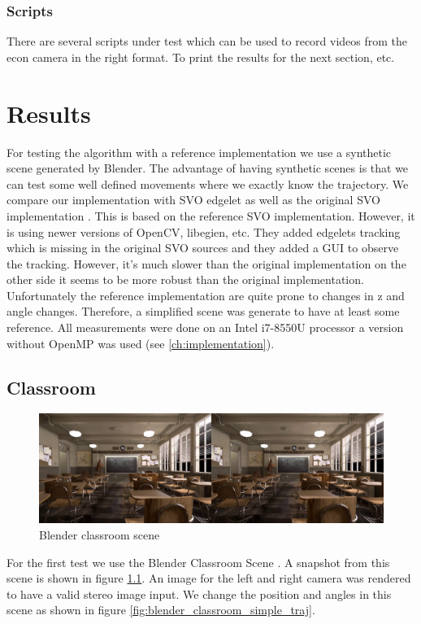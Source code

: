 \documentclass[11pt,a4paper,titlepage,oneside]{report}
\begin{document}
\subsection{Scripts}
There are several scripts under test which can be used to record videos from the econ camera in the right format. To print the results for the next section, etc.

\chapter{Results}\label{ch:results}

For testing the algorithm with a reference implementation we use a synthetic scene generated by Blender. The advantage of having synthetic scenes is that we can test some well defined movements where we exactly know the trajectory. We compare our implementation with SVO edgelet \cite{svo_edgled} as well as the original SVO implementation \cite{svo}. This is based on the reference SVO implementation. However, it is using newer versions of OpenCV, libegien, etc. They added edgelets tracking which is missing in the original SVO sources and they added a GUI to observe the tracking. However, it's much slower than the original implementation on the other side it seems to be more robust than the original implementation. Unfortunately the reference implementation are quite prone to changes in z and angle changes. Therefore, a simplified scene was generate to have at least some reference. All measurements were done on an Intel i7-8550U processor a version without OpenMP was used (see \ref{ch:implementation}).

\section{Classroom}
\begin{figure}[H]
  \includegraphics[width=1.0\textwidth]{img/blender_classroom_scene.png}
  \caption{Blender classroom scene}\label{fig:blender_classroom_scene}
\end{figure}

For the first test we use the Blender Classroom Scene \cite{blender}. A snapshot from this scene is shown in figure \ref{fig:blender_classroom_scene}. An image for the left and right camera was rendered to have a valid stereo image input. We change the position and angles in this scene as shown in figure \ref{fig:blender_classroom_simple_traj}.
\end{document}
